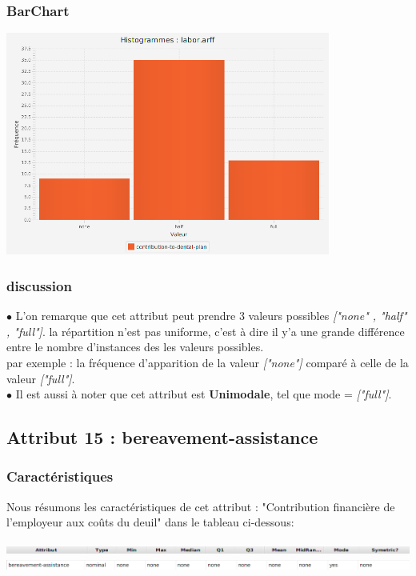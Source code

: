 \documentclass[12pt,a4paper,oneside]{book}
\begin{document}
\subsubsection{BarChart}

\begin{center}
	\includegraphics[width=0.8\textwidth]{screens/barchart/contribution-to-dental-plan-barchart.png}%
	\label{labelname}%
\end{center}

\subsubsection{discussion}
$\bullet $ L'on remarque que cet attribut peut prendre 3 valeurs possibles \textit{["none" , "half" , "full"]}. la répartition n'est pas uniforme, c'est à dire il y'a une grande différence entre le nombre d'instances des les valeurs possibles.\\
par exemple : la fréquence d'apparition de la valeur \textit{["none"]} comparé à celle de la valeur \textit{["full"]}.\\
$\bullet $ Il est aussi à noter que cet attribut est \textbf{Unimodale}, tel que mode = \textit{["full"]}.

\newpage

\subsection{Attribut 15 : bereavement-assistance }
\subsubsection{Caractéristiques}
Nous résumons les caractéristiques de cet attribut : "Contribution financière de l'employeur aux coûts du deuil" dans le tableau ci-dessous:
\begin{center}
	\includegraphics[width=1\textwidth]{screens/att.png}\\ \includegraphics[width=1\textwidth]{screens/att-17.png}%
	\label{labelname}%
\end{center}
\end{document}
